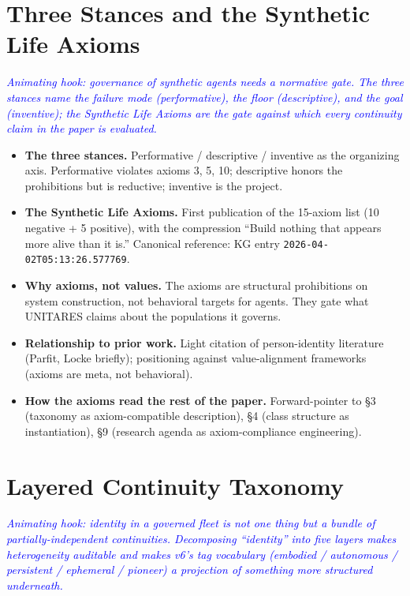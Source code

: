 \documentclass[11pt,twocolumn]{article}
\newcommand{\outlinenote}[1]{\textcolor{blue}{\textit{#1}}}
\begin{document}
\section{Three Stances and the Synthetic Life Axioms}
\outlinenote{Animating hook: governance of synthetic agents needs a
normative gate. The three stances name the failure mode
(performative), the floor (descriptive), and the goal (inventive);
the Synthetic Life Axioms are the gate against which every
continuity claim in the paper is evaluated.}

\begin{itemize}
  \item \textbf{The three stances.} Performative / descriptive /
        inventive as the organizing axis. Performative violates
        axioms 3, 5, 10; descriptive honors the prohibitions but is
        reductive; inventive is the project.
  \item \textbf{The Synthetic Life Axioms.} First publication of
        the 15-axiom list (10 negative + 5 positive), with the
        compression ``Build nothing that appears more alive than
        it is.'' Canonical reference: KG entry
        \texttt{2026-04-02T05:13:26.577769}.
  \item \textbf{Why axioms, not values.} The axioms are
        structural prohibitions on system construction, not
        behavioral targets for agents. They gate what UNITARES
        claims about the populations it governs.
  \item \textbf{Relationship to prior work.} Light citation of
        person-identity literature (Parfit, Locke briefly);
        positioning against value-alignment frameworks (axioms are
        meta, not behavioral).
  \item \textbf{How the axioms read the rest of the paper.}
        Forward-pointer to §3 (taxonomy as axiom-compatible
        description), §4 (class structure as instantiation),
        §9 (research agenda as axiom-compliance engineering).
\end{itemize}

\section{Layered Continuity Taxonomy}
\outlinenote{Animating hook: identity in a governed fleet is not
one thing but a bundle of partially-independent continuities.
Decomposing ``identity'' into five layers makes heterogeneity
auditable and makes v6's tag vocabulary (embodied / autonomous /
persistent / ephemeral / pioneer) a projection of something more
structured underneath.}
\end{document}
